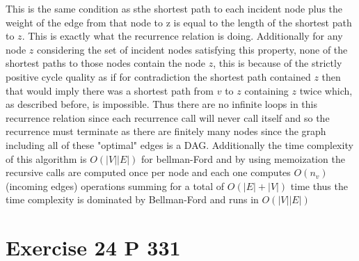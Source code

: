 \documentclass{amsart}
\begin{document}
This is the same condition as sthe shortest path to each incident node plus the weight of the edge from that node to z is equal to the length of the shortest path to $z$. This is exactly what the recurrence relation is doing.
Additionally for any node $z$ considering the set of incident nodes satisfying this property, none of the shortest paths to those nodes contain the node $z$, this is because of the strictly positive
cycle quality as if for contradiction the shortest path contained $z$ then that would imply there was a shortest path from $v$ to $z$ containing $z$ twice which, as described before, is impossible.
Thus there are no infinite loops in this recurrence relation since each recurrence call will never call itself and so the recurrence must terminate as there are finitely many nodes since the graph including all of these "optimal" edges is a DAG.
Additionally the time complexity of this algorithm is $O(|V||E|)$ for bellman-Ford and by using memoization the recursive calls are computed once per node and each one computes $O(n_v)$ (incoming edges) operations summing for a total of
 $O(|E| + |V|)$ time thus the time complexity is dominated by Bellman-Ford and runs in $O(|V||E|)$


\section{Exercise 24 P 331}
\end{document}
